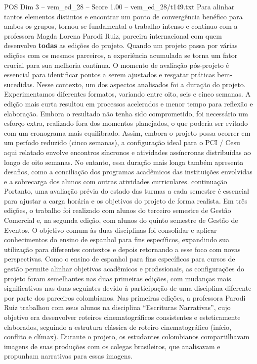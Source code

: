 \begin{textsample}{POS Dim 3 – vem\_ed\_28 – Score 1.00 – vem\_ed\_28/t149.txt}
Para alinhar tantos elementos distintos e encontrar um ponto de convergência benéfico para ambos os grupos, tornou-se fundamental o trabalho intenso e contínuo com a professora Magda Lorena Parodi Ruiz, parceira internacional com quem desenvolvo \textbf{todas} as edições do projeto.
Quando um projeto passa por várias edições com os mesmos parceiros, a experiência acumulada se torna um fator crucial para sua melhoria contínua.
O momento de avaliação pós-projeto é essencial para identificar pontos a serem ajustados e resgatar práticas bem-sucedidas.
Nesse contexto, um dos aspectos analisados foi a duração do projeto.
Experimentamos diferentes formatos, variando entre oito, seis e cinco semanas.
A edição mais curta resultou em processos acelerados e menor tempo para reflexão e elaboração.
Embora o resultado não tenha sido comprometido, foi necessário um esforço extra, realizado fora dos momentos planejados, o que poderia ser evitado com um cronograma mais equilibrado.
Assim, embora o projeto possa ocorrer em um período reduzido (cinco semanas), a configuração ideal para o PCI / Cesu aqui relatado envolve encontros síncronos e atividades assíncronas distribuídas ao longo de oito semanas.
No entanto, essa duração mais longa também apresenta desafios, como a conciliação dos programas acadêmicos das instituições envolvidas e a sobrecarga dos alunos com outras atividades curriculares. continuação Portanto, uma avaliação prévia do estado das turmas a cada semestre é essencial para ajustar a carga horária e os objetivos do projeto de forma realista.
Em três edições, o trabalho foi realizado com alunos do terceiro semestre de Gestão Comercial e, na segunda edição, com alunos do quinto semestre de Gestão de Eventos.
O objetivo comum às duas disciplinas foi consolidar e aplicar conhecimentos do ensino de espanhol para fins específicos, expandindo sua utilização para diferentes contextos e depois retornando a esse foco com novas perspectivas.
Como o ensino de espanhol para fins específicos para cursos de gestão permite alinhar objetivos acadêmicos e profissionais, as configurações do projeto foram semelhantes nas duas primeiras edições, com mudanças mais significativas nas duas seguintes devido à participação de uma disciplina diferente por parte dos parceiros colombianos.
Nas primeiras edições, a professora Parodi Ruiz trabalhou com seus alunos na disciplina “Escrituras Narrativas”, cujo objetivo era desenvolver roteiros cinematográficos consistentes e esteticamente elaborados, seguindo a estrutura clássica de roteiro cinematográfico (início, conflito e clímax).
Durante o projeto, os estudantes colombianos compartilhavam imagens de suas produções com os colegas brasileiros, que analisavam e propunham narrativas para essas imagens.

\end{textsample}
